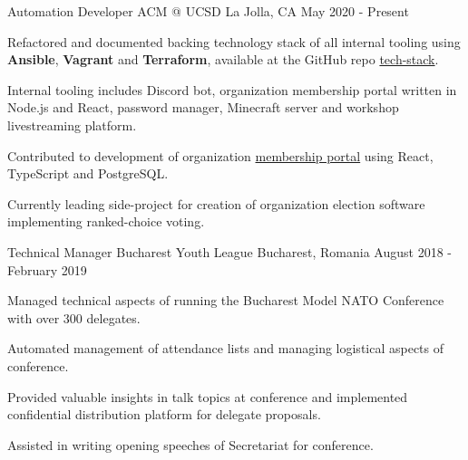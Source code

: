 
\begin{cventries}
  \cventry
    {Automation Developer}
    {ACM @ UCSD}
    {La Jolla, CA}
    {May 2020 - Present}
    {
      \begin{cvitems}
        \item {Refactored and documented backing technology stack of all internal tooling using \textbf{Ansible}, \textbf{Vagrant} and \textbf{Terraform}, available at the GitHub repo \href{https://github.com/acmucsd/tech-stack}{tech-stack}.}
        \item {Internal tooling includes Discord bot, organization membership portal written in Node.js and React, password manager, Minecraft server and workshop livestreaming platform.}
        \item {Contributed to development of organization \href{https://github.com/acmucsd/membership-portal-ui}{membership portal} using React, TypeScript and PostgreSQL.}
        \item {Currently leading side-project for creation of organization election software implementing ranked-choice voting.}
      \end{cvitems}
    }
  \cventry
    {Technical Manager}
    {Bucharest Youth League}
    {Bucharest, Romania}
    {August 2018 - February 2019}
    {
      \begin{cvitems}
        \item {Managed technical aspects of running the Bucharest Model NATO Conference with over 300 delegates.}
        \item {Automated management of attendance lists and managing logistical aspects of conference.}
        \item {Provided valuable insights in talk topics at conference and implemented confidential distribution platform for delegate proposals.}
        \item {Assisted in writing opening speeches of Secretariat for conference.}
      \end{cvitems}
    }
\end{cventries}
